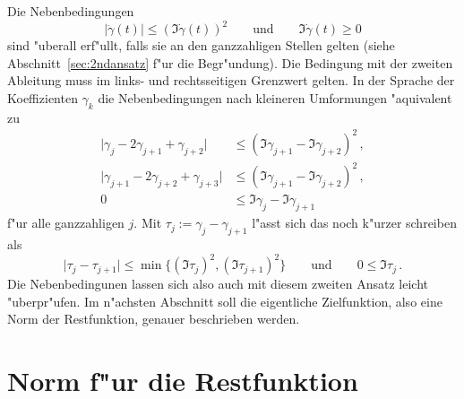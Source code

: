 \documentclass[a4paper]{scrartcl}
\begin{document}
Die Nebenbedingungen 
$$ \lvert\ddot\gamma(t)\rvert \le (\Im\dot\gamma(t))^2 
\qquad \text{und} \qquad
\Im\dot\gamma(t)\ge0 $$
sind "uberall erf"ullt, falls sie an den ganzzahligen Stellen gelten (siehe Abschnitt~\ref{sec:2ndansatz} f"ur die Begr"undung). 
Die Bedingung mit der zweiten Ableitung muss im links- und rechtsseitigen Grenzwert gelten. 
In der Sprache der Koeffizienten $\gamma_k$ die Nebenbedingungen nach kleineren Umformungen "aquivalent zu 
\begin{align*}
\lvert\gamma_j-2\gamma_{j+1}+\gamma_{j+2}\rvert 
&\le (\Im\gamma_{j+1}-\Im\gamma_{j+2})^2\,, \\
\lvert\gamma_{j+1}-2\gamma_{j+2}+\gamma_{j+3}\rvert 
&\le (\Im\gamma_{j+1}-\Im\gamma_{j+2})^2\,, \\
0&\le \Im\gamma_j-\Im\gamma_{j+1}
\end{align*}
f"ur alle ganzzahligen $j$. Mit 
$ \tau_j := \gamma_j-\gamma_{j+1} $
l"asst sich das noch k"urzer schreiben als
\begin{equation} \label{eq:condTau}
\lvert\tau_j-\tau_{j+1}\rvert \le \min\{(\Im\tau_j)^2, (\Im\tau_{j+1})^2\}
\qquad \text{und} \qquad
0\le\Im\tau_j\,.
\end{equation}
Die Nebenbedingunen lassen sich also auch mit diesem zweiten Ansatz leicht "uberpr"ufen. 
Im n"achsten Abschnitt soll die eigentliche Zielfunktion, also eine Norm der Restfunktion, genauer beschrieben werden.


\section{Norm f"ur die Restfunktion} \label{sec:norms4r}
\end{document}
